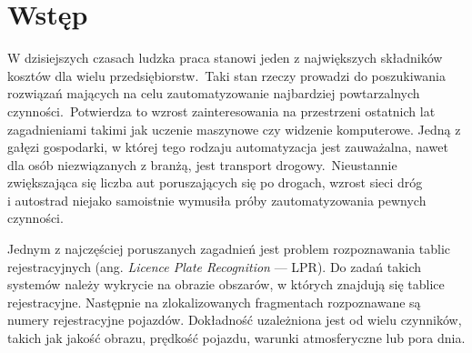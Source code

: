 %


\chapter*{Wstęp}

%
%

W dzisiejszych czasach ludzka praca stanowi jeden z największych składników kosztów dla wielu przedsiębiorstw.\ Taki stan rzeczy prowadzi do poszukiwania rozwiązań mających na celu zautomatyzowanie najbardziej powtarzalnych czynności.\ Potwierdza to wzrost zainteresowania na przestrzeni ostatnich lat zagadnieniami takimi jak uczenie maszynowe czy widzenie komputerowe.
Jedną z gałęzi gospodarki, w której tego rodzaju automatyzacja jest zauważalna, nawet dla osób niezwiązanych z branżą, jest transport drogowy.\ Nieustannie zwiększająca się liczba aut poruszających się po drogach, wzrost sieci dróg \\i autostrad niejako samoistnie wymusiła próby zautomatyzowania pewnych czynności.

Jednym z najczęściej poruszanych zagadnień jest problem rozpoznawania tablic rejestracyjnych (ang. \textit{Licence Plate Recognition} --- LPR).
Do zadań takich systemów należy wykrycie na obrazie obszarów, w których znajdują się tablice rejestracyjne.
Następnie na zlokalizowanych fragmentach rozpoznawane są numery rejestracyjne pojazdów.
Dokładność uzależniona jest od wielu czynników, takich jak jakość obrazu, prędkość pojazdu, warunki atmosferyczne lub pora dnia.

